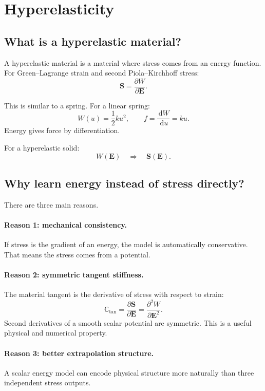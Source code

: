 \documentclass[11pt]{article}
\newcommand{\E}{\bm{E}}
\newcommand{\Sstress}{\bm{S}}
\newcommand{\dd}{\,\mathrm{d}}
\begin{document}
\section{Hyperelasticity}

\subsection{What is a hyperelastic material?}

A hyperelastic material is a material where stress comes from an energy
function. For Green--Lagrange strain and second Piola--Kirchhoff stress:
\[
  \Sstress = \frac{\partial W}{\partial \E}.
\]

This is similar to a spring. For a linear spring:
\[
  W(u)=\frac{1}{2}ku^2,
  \qquad
  f=\frac{\dd W}{\dd u}=ku.
\]
Energy gives force by differentiation.

For a hyperelastic solid:
\[
  W(\E) \quad \Rightarrow \quad \Sstress(\E).
\]

\subsection{Why learn energy instead of stress directly?}

There are three main reasons.

\paragraph{Reason 1: mechanical consistency.}
If stress is the gradient of an energy, the model is automatically conservative.
That means the stress comes from a potential.

\paragraph{Reason 2: symmetric tangent stiffness.}
The material tangent is the derivative of stress with respect to strain:
\[
  \mathbb{C}_{\mathrm{tan}}
  =
  \frac{\partial \Sstress}{\partial \E}
  =
  \frac{\partial^2 W}{\partial \E^2}.
\]
Second derivatives of a smooth scalar potential are symmetric. This is a useful
physical and numerical property.

\paragraph{Reason 3: better extrapolation structure.}
A scalar energy model can encode physical structure more naturally than three
independent stress outputs.
\end{document}
